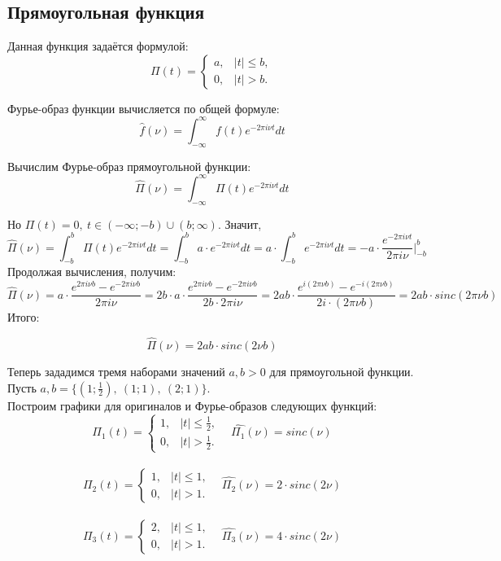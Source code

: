 \documentclass[a4paper, 12pt]{article}
\begin{document}
\subsection{Прямоугольная функция}

Данная функция задаётся формулой:
\[
    \Pi(t)=
    \begin{cases}
    a, & |t|\leq b,\\
    0, & |t|>b.
    \end{cases}
\]

Фурье-образ функции вычисляется по общей формуле:
\[
\hat{f}(\nu) = \int^{\infty}_{-\infty} f(t)e^{-2\pi i \nu t}dt
\]

Вычислим Фурье-образ прямоугольной функции:
\[
\hat{\Pi}(\nu) = \int^{\infty}_{-\infty} \Pi(t)e^{-2\pi i \nu t}dt
\]

Но $\Pi(t) = 0,\ t\in (-\infty; -b)\cup (b; \infty)$. Значит, 
\[
\hat{\Pi}(\nu) = \int^b_{-b} \Pi(t)e^{-2\pi i \nu t}dt =  \int^b_{-b} a \cdot e^{-2\pi i \nu t}dt = a \cdot \int^b_{-b}e^{-2\pi i \nu t}dt = -a \cdot \frac{e^{-2\pi i \nu t}}{2\pi i \nu} \Bigg|^{b}_{-b}
\]
Продолжая вычисления, получим:
\[
\hat{\Pi}(\nu) = a \cdot \frac{e^{2\pi i \nu b} - e^{-2\pi i \nu b}}{2\pi i \nu} = 2b \cdot a \cdot \frac{e^{2\pi i \nu b} - e^{-2\pi i \nu b}}{2b\cdot2\pi i \nu} = 2ab \cdot \frac{e^{ i (2\pi \nu b)} - e^{-i(2\pi \nu b)}}{2i\cdot (2\pi  \nu b)} = 2ab \cdot sinc (2\pi \nu b) 
\]
Итого: 

\[
\hat{\Pi}(\nu) = 2ab \cdot sinc (2\nu b) 
\]

Теперь зададимся тремя наборами значений $a, b > 0$ для прямоугольной функции. Пусть $a, b = \{(1; \frac{1}{2}),\ (1; 1),\ (2;1)\}$.\\

Построим графики для оригиналов и Фурье-образов следующих функций: 
\[
    \Pi_1(t)=
    \begin{cases}
    1, & |t|\leq \frac{1}{2},\\
    0, & |t|> \frac{1}{2}.
    \end{cases}\ \ \ \
\hat{\Pi_1}(\nu) = sinc (\nu) 
\]\\[1pt]
\[
    \Pi_2(t)=
    \begin{cases}
    1, & |t|\leq 1,\\
    0, & |t| > 1.
    \end{cases}\ \ \ \
\hat{\Pi_2}(\nu) = 2\cdot sinc (2\nu) 
\]\\[1pt]
\[
    \Pi_3(t)=
    \begin{cases}
    2, & |t|\leq 1,\\
    0, & |t|>1.
    \end{cases}\ \ \ \
\hat{\Pi_3}(\nu) = 4 \cdot sinc (2\nu) 
\]\\
\end{document}
